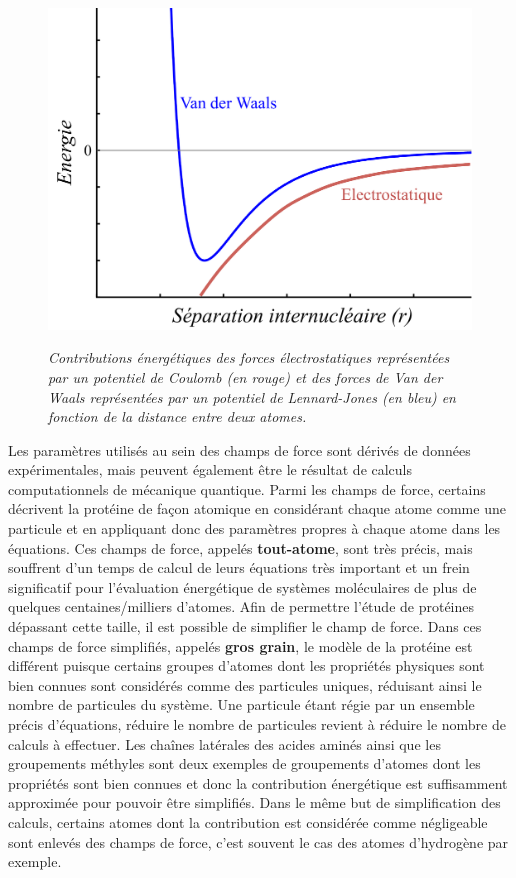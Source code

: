 \begin{figure}
  \centering
  {\includegraphics[width=0.75\linewidth]{./figures/ch1/electro_lennardjones.pdf}}
    \caption{\it Contributions énergétiques des forces électrostatiques représentées par un potentiel de Coulomb (en rouge) et des forces de Van der Waals représentées par un potentiel de Lennard-Jones (en bleu) en fonction de la distance entre deux atomes.}
    \label{Fig:coulomb_lennardjones}
  \hspace{0.3cm}
\end{figure}

Les paramètres utilisés au sein des champs de force sont dérivés de données expérimentales, mais peuvent également être le résultat de calculs computationnels de mécanique quantique. Parmi les champs de force, certains décrivent la protéine de façon atomique en considérant chaque atome comme une particule et en appliquant donc des paramètres propres à chaque atome dans les équations. Ces champs de force, appelés \textbf{tout-atome}, sont très précis, mais souffrent d'un temps de calcul de leurs équations très important et un frein significatif pour l'évaluation énergétique de systèmes moléculaires de plus de quelques centaines/milliers d'atomes. Afin de permettre l'étude de protéines dépassant cette taille, il est possible de simplifier le champ de force. Dans ces champs de force simplifiés, appelés \textbf{gros grain}, le modèle de la protéine est différent puisque certains groupes d'atomes dont les propriétés physiques sont bien connues sont considérés comme des particules uniques, réduisant ainsi le nombre de particules du système. Une particule étant régie par un ensemble précis d'équations, réduire le nombre de particules revient à réduire le nombre de calculs à effectuer. Les chaînes latérales des acides aminés ainsi que les groupements méthyles sont deux exemples de groupements d'atomes dont les propriétés sont bien connues et donc la contribution énergétique est suffisamment approximée pour pouvoir être simplifiés. Dans le même but de simplification des calculs, certains atomes dont la contribution est considérée comme négligeable sont enlevés des champs de force, c'est souvent le cas des atomes d'hydrogène par exemple.

